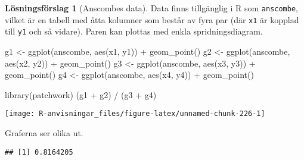 \documentclass[
]{book}
\newenvironment{Shaded}{\begin{snugshade}}{\end{snugshade}}
\newcommand{\FunctionTok}[1]{\textcolor[rgb]{0.00,0.00,0.00}{#1}}
\newcommand{\NormalTok}[1]{#1}
\newcommand{\OtherTok}[1]{\textcolor[rgb]{0.56,0.35,0.01}{#1}}
\newcommand{\SpecialCharTok}[1]{\textcolor[rgb]{0.00,0.00,0.00}{#1}}
\theoremstyle{definition}
\theoremstyle{definition}
\theoremstyle{definition}
\theoremstyle{definition}
\newtheorem{hypothesis}{Lösningsförslag}[chapter]
\theoremstyle{remark}
\begin{document}
\begin{hypothesis}[Anscombes data]
Data finns tillgänglig i R som \texttt{anscombe}, vilket är en tabell med åtta kolumner som består av fyra par (där \texttt{x1} är kopplad till \texttt{y1} och så vidare). Paren kan plottas med enkla spridningsdiagram.

\begin{Shaded}
\begin{Highlighting}[]
\NormalTok{g1 }\OtherTok{\textless{}{-}} \FunctionTok{ggplot}\NormalTok{(anscombe, }\FunctionTok{aes}\NormalTok{(x1, y1)) }\SpecialCharTok{+} \FunctionTok{geom\_point}\NormalTok{()}
\NormalTok{g2 }\OtherTok{\textless{}{-}} \FunctionTok{ggplot}\NormalTok{(anscombe, }\FunctionTok{aes}\NormalTok{(x2, y2)) }\SpecialCharTok{+} \FunctionTok{geom\_point}\NormalTok{()}
\NormalTok{g3 }\OtherTok{\textless{}{-}} \FunctionTok{ggplot}\NormalTok{(anscombe, }\FunctionTok{aes}\NormalTok{(x3, y3)) }\SpecialCharTok{+} \FunctionTok{geom\_point}\NormalTok{()}
\NormalTok{g4 }\OtherTok{\textless{}{-}} \FunctionTok{ggplot}\NormalTok{(anscombe, }\FunctionTok{aes}\NormalTok{(x4, y4)) }\SpecialCharTok{+} \FunctionTok{geom\_point}\NormalTok{()}

\FunctionTok{library}\NormalTok{(patchwork)}
\NormalTok{(g1 }\SpecialCharTok{+}\NormalTok{ g2) }\SpecialCharTok{/}\NormalTok{ (g3 }\SpecialCharTok{+}\NormalTok{ g4)}
\end{Highlighting}
\end{Shaded}

\begin{center}\texttt{[image: R-anvisningar\_files/figure-latex/unnamed-chunk-226-1]} \end{center}

Graferna ser olika ut.

\begin{Shaded}
\end{Shaded}

\begin{verbatim}
## [1] 0.8164205
\end{verbatim}

\begin{Shaded}
\end{Shaded}


\end{hypothesis}
\end{document}

